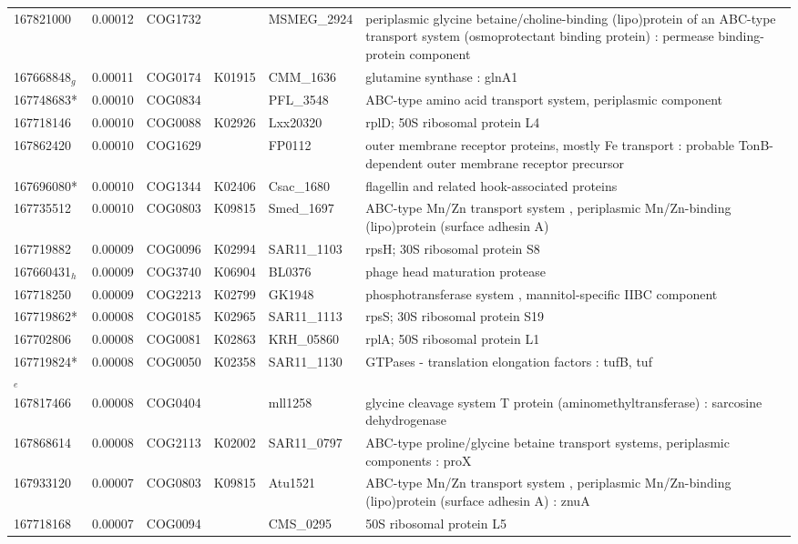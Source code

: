 \begin{landscape}
\begin{longtable}{p{1.6cm}p{1.2cm}p{1.5cm}p{1.5cm}p{2.8cm}p{13.5cm}}
167821000 & 0.00012 & COG1732 &  & MSMEG\_2924 & periplasmic glycine betaine/choline-binding (lipo)protein of an ABC-type transport system (osmoprotectant binding protein) : permease binding-protein component \\
167668848$_g$ & 0.00011 & COG0174 & K01915 & CMM\_1636 & glutamine synthase : glnA1 \\
167748683* & 0.00010 & COG0834 &  & PFL\_3548 & ABC-type amino acid transport system,  periplasmic component \\
167718146 & 0.00010 & COG0088 & K02926 & Lxx20320 & rplD; 50S ribosomal protein L4 \\
167862420 & 0.00010 & COG1629 &  & FP0112 & outer membrane receptor proteins,  mostly Fe transport : probable TonB-dependent outer membrane receptor precursor \\
167696080* & 0.00010 & COG1344 & K02406 & Csac\_1680 & flagellin and related hook-associated proteins \\
167735512 & 0.00010 & COG0803 & K09815 & Smed\_1697 & ABC-type Mn/Zn transport system ,  periplasmic Mn/Zn-binding (lipo)protein (surface adhesin A) \\
167719882 & 0.00009 & COG0096 & K02994 & SAR11\_1103 & rpsH; 30S ribosomal protein S8 \\
167660431$_h$ & 0.00009 & COG3740 & K06904 & BL0376 & phage head maturation protease \\
167718250 & 0.00009 & COG2213 & K02799 & GK1948 & phosphotransferase system ,  mannitol-specific IIBC component \\
167719862* & 0.00008 & COG0185 & K02965 & SAR11\_1113 & rpsS; 30S ribosomal protein S19 \\
167702806 & 0.00008 & COG0081 & K02863 & KRH\_05860 & rplA; 50S ribosomal protein L1 \\
167719824*$_e$ & 0.00008 & COG0050 & K02358 & SAR11\_1130 & GTPases - translation elongation factors : tufB,  tuf \\
167817466 & 0.00008 & COG0404 &  & mll1258 & glycine cleavage system T protein (aminomethyltransferase) : sarcosine dehydrogenase \\
167868614 & 0.00008 & COG2113 & K02002 & SAR11\_0797 & ABC-type proline/glycine betaine transport systems,  periplasmic components : proX \\
167933120 & 0.00007 & COG0803 & K09815 & Atu1521 & ABC-type Mn/Zn transport system ,  periplasmic Mn/Zn-binding (lipo)protein (surface adhesin A) : znuA \\
167718168 & 0.00007 & COG0094 &  & CMS\_0295 & 50S ribosomal protein L5 \\

\end{longtable}
\end{landscape}
